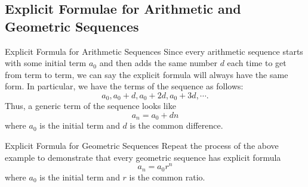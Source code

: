 \subsection{Explicit Formulae for Arithmetic and Geometric Sequences}\label{Toemato}
\begin{example}{Explicit Formula for Arithmetic Sequences}
Since every arithmetic sequence starts with some initial term $a_0$ and then adds the same number $d$ each time to get from term to term, we can say the explicit formula will always have the same form.  In particular, we have the terms of the sequence as follows: $$a_0, a_0+d, a_0+2d, a_0+3d,\cdots. $$
Thus, a generic term of the sequence looks like $$a_n=a_0+dn$$ where $a_0$ is the initial term and $d$ is the common difference.
\end{example}
\begin{exercise}{Explicit Formula for Geometric Sequences \Coffeecup \Coffeecup}\label{UsedToBePlicit}
Repeat the process of the above example to demonstrate that every geometric sequence has explicit formula $$a_n=a_0r^n $$ where $a_0$ is the initial term and $r$ is the common ratio.

\end{exercise}
